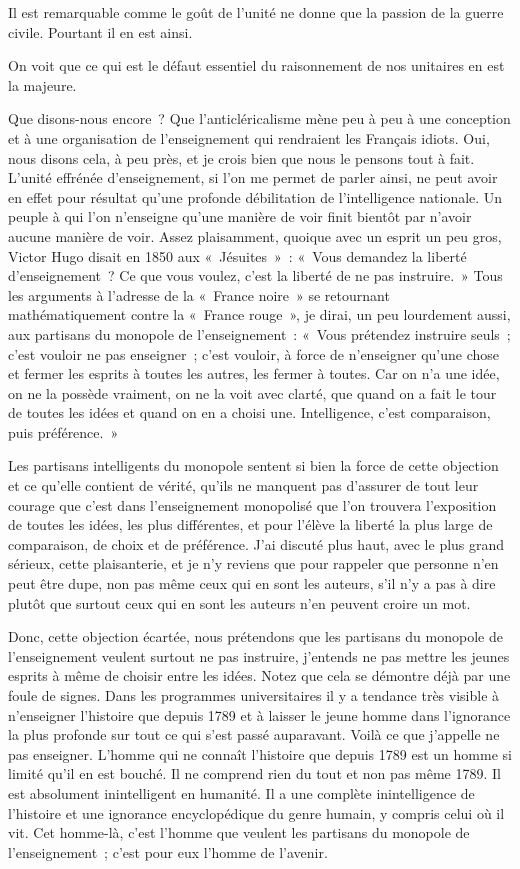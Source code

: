 \documentclass[french,twoside]{book} %
\begin{document}
Il est remarquable comme le goût de l’unité ne donne que la passion de la guerre civile. Pourtant il en est ainsi.\par
On voit que ce qui est le défaut essentiel du raisonnement de nos unitaires en est la majeure.\par
Que disons-nous encore ? Que l’anticléricalisme mène peu à peu à une conception et à une organisation de l’enseignement qui rendraient les Français idiots. Oui, nous disons cela, à peu près, et je crois bien que nous le pensons tout à fait. L’unité effrénée d’enseignement, si l’on me permet de parler ainsi, ne peut avoir en effet pour résultat qu’une profonde débilitation de l’intelligence nationale. Un peuple à qui l’on n’enseigne qu’une manière de voir finit bientôt par n’avoir aucune manière de voir. Assez plaisamment, quoique avec un esprit un peu gros, Victor Hugo disait en 1850 aux « Jésuites » : « Vous demandez la liberté d’enseignement ? Ce que vous voulez, c’est la liberté de ne pas instruire. » Tous les arguments à l’adresse de la « France noire » se retournant mathématiquement contre la « France rouge », je dirai, un peu lourdement aussi, aux partisans du  monopole de l’enseignement : « Vous prétendez instruire seuls ; c’est vouloir ne pas enseigner ; c’est vouloir, à force de n’enseigner qu’une chose et fermer les esprits à toutes les autres, les fermer à toutes. Car on n’a une idée, on ne la possède vraiment, on ne la voit avec clarté, que quand on a fait le tour de toutes les idées et quand on en a choisi une. Intelligence, c’est comparaison, puis préférence. »\par
Les partisans intelligents du monopole sentent si bien la force de cette objection et ce qu’elle contient de vérité, qu’ils ne manquent pas d’assurer de tout leur courage que c’est dans l’enseignement monopolisé que l’on trouvera l’exposition de toutes les idées, les plus différentes, et pour l’élève la liberté la plus large de comparaison, de choix et de préférence. J’ai discuté plus haut, avec le plus grand sérieux, cette plaisanterie, et je n’y reviens que pour rappeler que personne n’en peut être dupe, non pas même ceux qui en sont les auteurs, s’il n’y a pas à dire plutôt que surtout ceux qui en sont les auteurs n’en peuvent croire un mot.\par
Donc, cette objection écartée, nous prétendons que les partisans du monopole de l’enseignement veulent surtout ne pas instruire, j’entends ne pas mettre les jeunes esprits à même de choisir  entre les idées. Notez que cela se démontre déjà par une foule de signes. Dans les programmes universitaires il y a tendance très visible à n’enseigner l’histoire que depuis 1789 et à laisser le jeune homme dans l’ignorance la plus profonde sur tout ce qui s’est passé auparavant. Voilà ce que j’appelle ne pas enseigner. L’homme qui ne connaît l’histoire que depuis 1789 est un homme si limité qu’il en est bouché. Il ne comprend rien du tout et non pas même 1789. Il est absolument inintelligent en humanité. Il a une complète inintelligence de l’histoire et une ignorance encyclopédique du genre humain, y compris celui où il vit. Cet homme-là, c’est l’homme que veulent les partisans du monopole de l’enseignement ; c’est pour eux l’homme de l’avenir.\par
\end{document}
